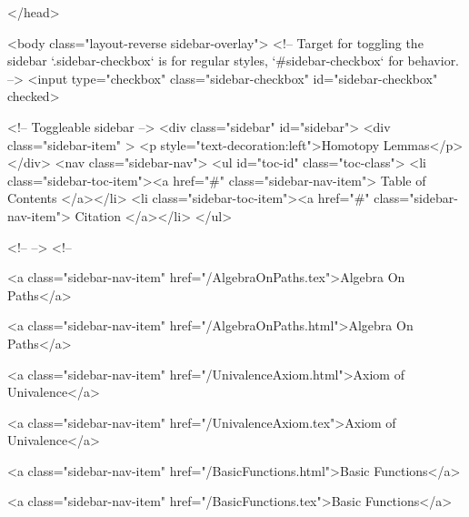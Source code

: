   
</head>




  <body class="layout-reverse sidebar-overlay">
    <!-- Target for toggling the sidebar `.sidebar-checkbox` is for regular
     styles, `#sidebar-checkbox` for behavior. -->
<input type="checkbox" class="sidebar-checkbox" id="sidebar-checkbox" checked>

<!-- Toggleable sidebar -->
<div class="sidebar" id="sidebar">
  <div class="sidebar-item" >
    <p style="text-decoration:left">Homotopy Lemmas</p>
  </div>
  <nav class="sidebar-nav">
    <ul id="toc-id" class="toc-class">
  <li class="sidebar-toc-item"><a href="#" class="sidebar-nav-item"> Table of Contents </a></li>
  <li class="sidebar-toc-item"><a href="#" class="sidebar-nav-item"> Citation </a></li>
</ul>


    <!--  -->
    <!-- 
      
    
      
    
      
    
      
        
      
    
      
        
          <a class="sidebar-nav-item" href="/AlgebraOnPaths.tex">Algebra On Paths</a>
        
      
    
      
        
          <a class="sidebar-nav-item" href="/AlgebraOnPaths.html">Algebra On Paths</a>
        
      
    
      
        
          <a class="sidebar-nav-item" href="/UnivalenceAxiom.html">Axiom of Univalence</a>
        
      
    
      
        
          <a class="sidebar-nav-item" href="/UnivalenceAxiom.tex">Axiom of Univalence</a>
        
      
    
      
        
          <a class="sidebar-nav-item" href="/BasicFunctions.html">Basic Functions</a>
        
      
    
      
        
          <a class="sidebar-nav-item" href="/BasicFunctions.tex">Basic Functions</a>
        
      
    
